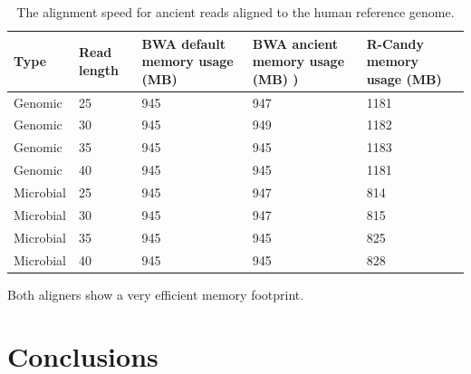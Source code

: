 \documentclass[11pt,a4paper]{report}
\begin{document}
\begin{table}[H]
  \begin{tabular}{ |  p{2cm} | p{2cm} | p{2cm} | p{2cm} |p{2cm} | }
    \hline
  	\textbf{Type} & \textbf{Read length }&\textbf{ BWA  
  		default memory usage (MB) }
  	&\textbf{ BWA ancient memory usage (MB) )} 
  	& \textbf{R-Candy memory usage (MB) }\\ \hline
 	  Genomic    & 25  & 945 &  947   &  1181 \\ \hline
      Genomic    & 30  & 945 &  949  &  1182 \\ \hline
      Genomic    & 35  & 945 &  945   &  1183 \\ \hline
 	  Genomic	 & 40  & 945 &  945   &  1181 \\ \hline
 	  Microbial  & 25  & 945 &  947   &  814 \\ \hline
      Microbial  & 30  & 945 &  947   &  815 \\ \hline
 	  Microbial  & 35  & 945 &  945   &  825 \\ \hline
 	  Microbial  & 40  & 945 &  945   &  828 \\ \hline
   \end{tabular}
\caption{The alignment speed for ancient reads aligned to 
the human reference genome.}
\label{speed-RG}
\end{table}

Both aligners show a very efficient memory footprint.








\section{Conclusions} \label{Conclusions}
\end{document}
